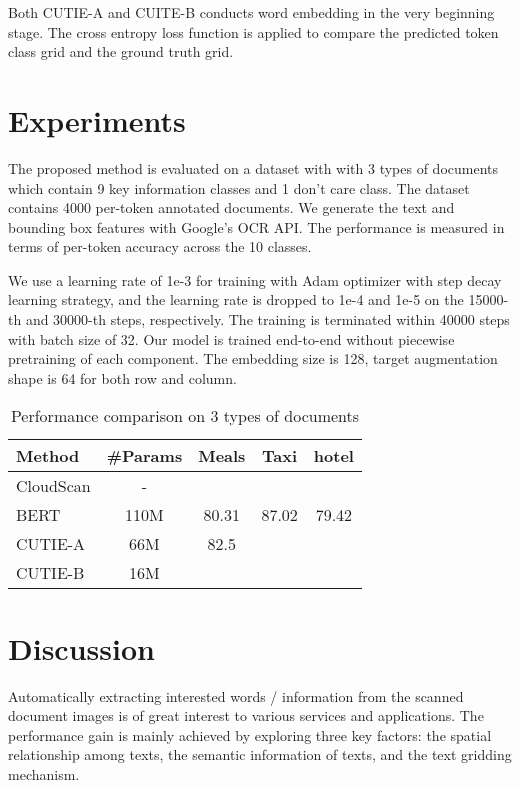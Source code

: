 \documentclass[10pt,twocolumn,letterpaper]{article}
\begin{document}
Both CUTIE-A and CUITE-B conducts word embedding in the very beginning stage. The cross entropy loss function is applied to compare the predicted token class grid and the ground truth grid.

\section{Experiments}
The proposed method is evaluated on a dataset with with 3 types of documents which contain 9 key information classes and 1 don't care class. The dataset contains 4000 per-token annotated documents. We generate the text and bounding box features with Google's OCR API. The performance is measured in terms of per-token accuracy across the 10 classes. 

We use a learning rate of 1e-3 for training with Adam optimizer with step decay learning strategy, and the learning rate is dropped to 1e-4 and 1e-5 on the 15000-th and 30000-th steps, respectively. The training is terminated within 40000 steps with batch size of 32. Our model is trained end-to-end without piecewise pretraining of each component. The embedding size is 128, target augmentation shape is 64 for both row and column. 

\begin{table}
	\caption{Performance comparison on 3 types of documents}
\begin{center}
\begin{tabular}{l | c | c | c | c}
	Method & \#Params & Meals & Taxi & hotel \\
	\hline
	CloudScan & - & & & \\
	BERT & 110M & 80.31 & 87.02 & 79.42 \\
	CUTIE-A & 66M & 82.5 & & \\
	CUTIE-B & 16M & & \\
\end{tabular}
\end{center}
\end{table}


\section{Discussion}
Automatically extracting interested words / information from the scanned document images is of great interest to various services and applications. The performance gain is mainly achieved by exploring three key factors: the spatial relationship among texts, the semantic information of texts, and the text gridding mechanism.

{\small


}
\end{document}
